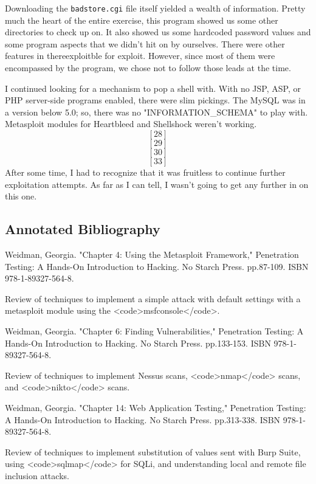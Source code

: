  
 

 Downloading the \texttt{badstore.cgi} file itself yielded a wealth of information.  Pretty much the heart of the entire exercise, this program showed us some other directories to check up on.  It also showed us some hardcoded password values and some program aspects that we didn't hit on by ourselves.  There were other features in thereexploitble for exploit.  However, since most of them were encompassed by the program, we chose not to follow those leads at the time.  

I continued looking for a mechanism to pop a shell with.  With no JSP, ASP, or PHP server-side programs enabled, there were slim pickings.  The MySQL was in a version below 5.0; so, there was no "INFORMATION\_SCHEMA" to play with.  Metasploit modules for Heartbleed and Shellshock weren't working. \[[28]\] \[[29]\] \[[30]\] \[[33]\]  After some time, I had to recognize that it was fruitless to continue further exploitation attempts.  As far as I can tell, I wasn't going to get any further in on this one.  

  

\subsection{Annotated Bibliography}
\endnote{[1]}  Weidman, Georgia.  "Chapter 4:  Using the Metasploit Framework," Penetration Testing:  A Hands-On Introduction to Hacking.  No Starch Press.  pp.87-109.  ISBN 978-1-89327-564-8.

Review of techniques to implement a simple attack with default settings with a metasploit module using the <code>msfconsole</code>. 

\endnote{[2]}  Weidman, Georgia.  "Chapter 6:  Finding Vulnerabilities," Penetration Testing:  A Hands-On Introduction to Hacking.  No Starch Press.  pp.133-153.  ISBN 978-1-89327-564-8.

Review of techniques to implement Nessus scans, <code>nmap</code> scans, and <code>nikto</code> scans. 

\endnote{[3]} Weidman, Georgia.  "Chapter 14:  Web Application Testing," Penetration Testing:  A Hands-On Introduction to Hacking.  No Starch Press.  pp.313-338.  ISBN 978-1-89327-564-8.

Review of techniques to implement substitution of values sent with Burp Suite, using <code>sqlmap</code> for SQLi, and understanding local and remote file inclusion attacks.

